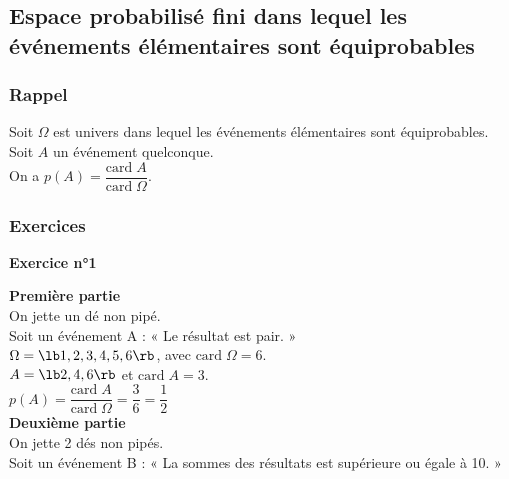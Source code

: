 \vspace*{-5cm}

\newpage

\subsection{Espace probabilisé fini dans lequel les événements élémentaires sont équiprobables}

\subsubsection{Rappel}

Soit $\Omega$ est univers dans lequel les événements élémentaires sont équiprobables. \\
Soit $A$ un événement quelconque. \\

On a $p\left(A\right) = \dfrac{\mathrm{card} \; A}{\mathrm{card} \; \Omega}$.  

\subsubsection{Exercices}

\textbf{Exercice n°1} \\

\vspace*{-.2cm}

\textbf{Première partie} \\

On jette un dé non pipé. \\ 

Soit un événement A : « Le résultat est pair. » \\

$\Omega = \lb 1,2,3,4,5,6 \rb $, avec $\mathrm{card} \; \Omega = 6$. \\

$ A = \lb 2,4,6 \rb $ et $ \mathrm{card} \; A = 3$. \\

$p\left(A\right) = \dfrac{\mathrm{card} \; A}{\mathrm{card} \; \Omega} = \dfrac{3}{6} = \dfrac{1}{2} $ \\

\textbf{Deuxième partie} \\

On jette 2 dés non pipés. \\ 

Soit un événement B : « La sommes des résultats est supérieure ou égale à 10. » \\

